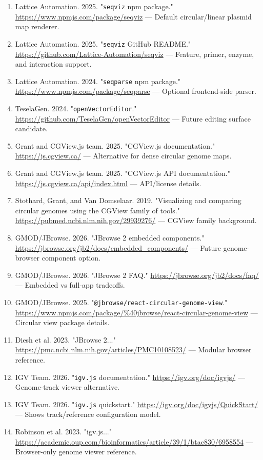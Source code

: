 \documentclass[11pt]{report}
\begin{document}
\begin{enumerate}
\item Lattice Automation. 2025. "\texttt{seqviz} npm package." \url{https://www.npmjs.com/package/seqviz} — Default circular/linear plasmid map renderer.
\item Lattice Automation. 2025. "\texttt{seqviz} GitHub README." \url{https://github.com/Lattice-Automation/seqviz} — Feature, primer, enzyme, and interaction support.
\item Lattice Automation. 2024. "\texttt{seqparse} npm package." \url{https://www.npmjs.com/package/seqparse} — Optional frontend-side parser.
\item TeselaGen. 2024. "\texttt{openVectorEditor}." \url{https://github.com/TeselaGen/openVectorEditor} — Future editing surface candidate.
\item Grant and CGView.js team. 2025. "CGView.js documentation." \url{https://js.cgview.ca/} — Alternative for dense circular genome maps.
\item Grant and CGView.js team. 2025. "CGView.js API documentation." \url{https://js.cgview.ca/api/index.html} — API/license details.
\item Stothard, Grant, and Van Domselaar. 2019. "Visualizing and comparing circular genomes using the CGView family of tools." \url{https://pubmed.ncbi.nlm.nih.gov/29939276/} — CGView family background.
\item GMOD/JBrowse. 2026. "JBrowse 2 embedded components." \url{https://jbrowse.org/jb2/docs/embedded_components/} — Future genome-browser component option.
\item GMOD/JBrowse. 2026. "JBrowse 2 FAQ." \url{https://jbrowse.org/jb2/docs/faq/} — Embedded vs full-app tradeoffs.
\item GMOD/JBrowse. 2025. "\texttt{@jbrowse/react-circular-genome-view}." \url{https://www.npmjs.com/package/\%40jbrowse/react-circular-genome-view} — Circular view package details.
\item Diesh et al. 2023. "JBrowse 2..." \url{https://pmc.ncbi.nlm.nih.gov/articles/PMC10108523/} — Modular browser reference.
\item IGV Team. 2026. "\texttt{igv.js} documentation." \url{https://igv.org/doc/igvjs/} — Genome-track viewer alternative.
\item IGV Team. 2026. "\texttt{igv.js} quickstart." \url{https://igv.org/doc/igvjs/QuickStart/} — Shows track/reference configuration model.
\item Robinson et al. 2023. "igv.js..." \url{https://academic.oup.com/bioinformatics/article/39/1/btac830/6958554} — Browser-only genome viewer reference.
\end{enumerate}
\end{document}
